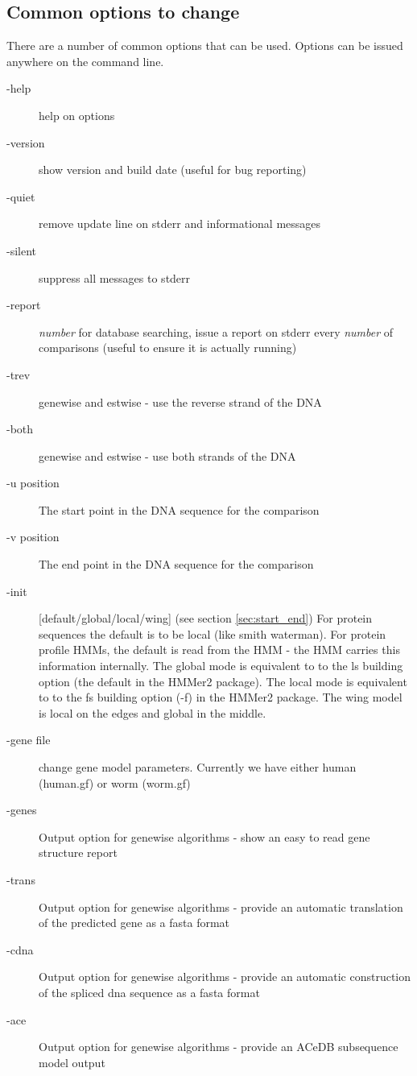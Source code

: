 \documentclass{article}
\begin{document}
\subsection{Common options to change}

There are a number of common options that can be used. Options can be issued anywhere
on the command line.

\begin{description}
\item[-help] help on options
\item[-version] show version and build date (useful for bug reporting)
\item[-quiet] remove update line on stderr and informational messages
\item[-silent] suppress all messages to stderr
\item[-report] \emph{number} for database searching, issue a report on stderr every
\emph{number} of comparisons (useful to ensure it is actually running)
\item[-trev] genewise and estwise - use the reverse strand of the DNA
\item[-both] genewise and estwise - use both strands of the DNA
\item[-u position] The start point in the DNA sequence for the comparison
\item[-v position] The end point in the DNA sequence for the comparison
\item[-init]   [default/global/local/wing]  (see section \ref{sec:start_end})
For protein sequences the default is to be local (like
smith waterman). For protein profile HMMs, the default is read from the HMM - the
HMM carries this information internally. The global mode is equivalent to to the ls building option
(the default in the HMMer2 package). The local mode is equivalent to to the fs building option (-f)
in the HMMer2 package. The wing model is local on the edges and global in the middle.
\item[-gene file] change gene model parameters. Currently we have either
human (human.gf) or worm (worm.gf)
\item[-genes] Output option for genewise algorithms - show an easy to read gene
structure report
\item[-trans] Output option for genewise algorithms - provide an automatic
translation of the predicted gene as a fasta format
\item[-cdna] Output option for genewise algorithms - provide an automatic
construction of the spliced dna sequence as a fasta format
\item[-ace] Output option for genewise algorithms - provide an ACeDB 
subsequence model output
\end{description}
\end{document}
